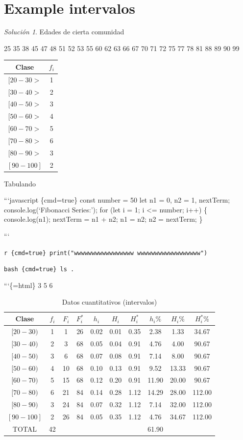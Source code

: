 \documentclass[10pt,]{krantz}
\theoremstyle{definition}
\theoremstyle{definition}
\theoremstyle{definition}
\theoremstyle{definition}
\theoremstyle{remark}
\newtheorem*{solution}{Solución}
\begin{document}
\hypertarget{example-intervalos}{%
\section{Example intervalos}\label{example-intervalos}}

\begin{solution}
{}
Edades de cierta comunidad

25
35 38
45 47 48
51 52 53 55
60 62 63 66 67
70 71 72 75 77 78
81 88 89
90 99

\begin{longtable}[]{@{}cc@{}}
\toprule
Clase & \(f_i\)\tabularnewline
\midrule
\endhead
\([20-30>\) & 1\tabularnewline
\([30-40>\) & 2\tabularnewline
\([40-50>\) & 3\tabularnewline
\([50-60>\) & 4\tabularnewline
\([60-70>\) & 5\tabularnewline
\([70-80>\) & 6\tabularnewline
\([80-90>\) & 3\tabularnewline
\([90-100]\) & 2\tabularnewline
\bottomrule
\end{longtable}
\end{solution}

Tabulando

```javascript \{cmd=true\}
const number = 50
let n1 = 0, n2 = 1, nextTerm; console.log(`Fibonacci Series:'); for (let i = 1; i \textless{}= number; i++) \{ console.log(n1); nextTerm = n1 + n2; n1 = n2; n2 = nextTerm; \}

```

\texttt{r\ \{cmd=true\}\ print("wwwwwwwwwwwwwwwww\ wwwwwwwwwwwwwwwwww")}

\texttt{bash\ \{cmd=true\}\ ls\ .}

```\{=html\}
3
5
6

\begin{longtable}[t]{cccccccccc}
\caption{\label{tab:cuantitativa}Datos cuantitativos (intervalos)}\\
\toprule
Clase & $f_i$ & $F_i$ & $F_i^*$ & $h_i$ & $H_i$ & $H_i^*$ & $h_i\%$ & $H_i\%$ & $H_i^*\%$\\
\midrule
$[20-30)$ & 1 & 1 & 26 & 0.02 & 0.01 & 0.35 & 2.38 & 1.33 & 34.67\\
$[30-40)$ & 2 & 3 & 68 & 0.05 & 0.04 & 0.91 & 4.76 & 4.00 & 90.67\\
$[40-50)$ & 3 & 6 & 68 & 0.07 & 0.08 & 0.91 & 7.14 & 8.00 & 90.67\\
$[50-60)$ & 4 & 10 & 68 & 0.10 & 0.13 & 0.91 & 9.52 & 13.33 & 90.67\\
$[60-70)$ & 5 & 15 & 68 & 0.12 & 0.20 & 0.91 & 11.90 & 20.00 & 90.67\\
$[70-80)$ & 6 & 21 & 84 & 0.14 & 0.28 & 1.12 & 14.29 & 28.00 & 112.00\\
$[80-90)$ & 3 & 24 & 84 & 0.07 & 0.32 & 1.12 & 7.14 & 32.00 & 112.00\\
$[90-100]$ & 2 & 26 & 84 & 0.05 & 0.35 & 1.12 & 4.76 & 34.67 & 112.00\\
TOTAL & 42 &  &  &  &  &  & 61.90 &  & \\
\bottomrule
\end{longtable}
\end{document}
